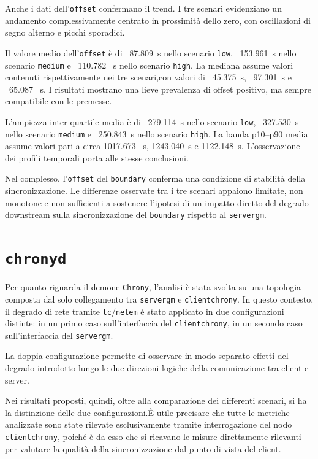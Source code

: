 Anche i dati dell'\texttt{offset} confermano il trend. I tre scenari evidenziano un
andamento complessivamente centrato in prossimità dello zero, con oscillazioni
di segno alterno e picchi sporadici.

Il valore medio dell'\texttt{offset} è di ~87.809~\textmu s nello scenario
\texttt{low}, ~153.961~\textmu s nello scenario \texttt{medium} e ~110.782~\textmu
s nello scenario \texttt{high}. La mediana assume valori contenuti rispettivamente
nei tre scenari,con valori di ~45.375~\textmu s, ~97.301~\textmu s e ~65.087~\textmu
s. I risultati mostrano una lieve prevalenza di offset positivo, ma sempre compatibile
con le premesse.

L'ampiezza inter-quartile media è di ~279.114~\textmu s nello scenario \texttt{low},
~327.530~\textmu s nello scenario \texttt{medium} e ~250.843~\textmu s nello scenario
\texttt{high}. La banda p10--p90 media assume valori pari a circa 1017.673~\textmu
s, 1243.040~\textmu s e 1122.148~\textmu s. L'osservazione dei profili temporali
porta alle stesse conclusioni.

Nel complesso, l'\texttt{offset} del \texttt{boundary} conferma una condizione di
stabilità della sincronizzazione. Le differenze osservate tra i tre scenari
appaiono limitate, non monotone e non sufficienti a sostenere l'ipotesi di un impatto
diretto del degrado downstream sulla sincronizzazione del \texttt{boundary}
rispetto al \texttt{servergm}.

\section{\texttt{chronyd}}
Per quanto riguarda il demone \texttt{Chrony}, l'analisi è stata svolta su una topologia
composta dal solo collegamento tra \texttt{servergm} e \texttt{clientchrony}. In
questo contesto, il degrado di rete tramite \texttt{tc}/\texttt{netem} è stato applicato
in due configurazioni distinte: in un primo caso sull'interfaccia del \texttt{clientchrony},
in un secondo caso sull'interfaccia del \texttt{servergm}.

La doppia configurazione permette di osservare in modo separato effetti del degrado
introdotto lungo le due direzioni logiche della comunicazione tra client e server.

Nei risultati proposti, quindi, oltre alla comparazione dei differenti scenari,
si ha la distinzione delle due configurazioni.È utile precisare che tutte le
metriche analizzate sono state rilevate esclusivamente tramite interrogazione
del nodo \texttt{clientchrony}, poiché è da esso che si ricavano le misure
direttamente rilevanti per valutare la qualità della sincronizzazione dal punto
di vista del client.

